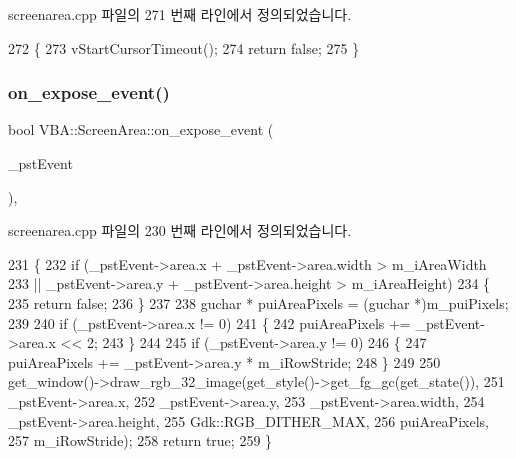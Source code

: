 screenarea.\+cpp 파일의 271 번째 라인에서 정의되었습니다.


\begin{DoxyCode}
272 \{
273   vStartCursorTimeout();
274   \textcolor{keywordflow}{return} \textcolor{keyword}{false};
275 \}
\end{DoxyCode}
\mbox{\label{class_v_b_a_1_1_screen_area_ab800ac1ff230ac9cf33ac144e614160e}} 
\subsubsection{\texorpdfstring{on\+\_\+expose\+\_\+event()}{on\_expose\_event()}}
{\footnotesize\ttfamily bool V\+B\+A\+::\+Screen\+Area\+::on\+\_\+expose\+\_\+event (\begin{DoxyParamCaption}\item[{Gdk\+Event\+Expose $\ast$}]{\+\_\+pst\+Event }\end{DoxyParamCaption})\hspace{0.3cm}{\ttfamily [protected]}, {\ttfamily [virtual]}}



screenarea.\+cpp 파일의 230 번째 라인에서 정의되었습니다.


\begin{DoxyCode}
231 \{
232   \textcolor{keywordflow}{if} (\_pstEvent->area.x + \_pstEvent->area.width > m\_iAreaWidth
233       || \_pstEvent->area.y + \_pstEvent->area.height > m\_iAreaHeight)
234   \{
235     \textcolor{keywordflow}{return} \textcolor{keyword}{false};
236   \}
237 
238   guchar * puiAreaPixels = (guchar *)m\_puiPixels;
239 
240   \textcolor{keywordflow}{if} (\_pstEvent->area.x != 0)
241   \{
242     puiAreaPixels += \_pstEvent->area.x << 2;
243   \}
244 
245   \textcolor{keywordflow}{if} (\_pstEvent->area.y != 0)
246   \{
247     puiAreaPixels += \_pstEvent->area.y * m\_iRowStride;
248   \}
249 
250   get\_window()->draw\_rgb\_32\_image(get\_style()->get\_fg\_gc(get\_state()),
251                                   \_pstEvent->area.x,
252                                   \_pstEvent->area.y,
253                                   \_pstEvent->area.width,
254                                   \_pstEvent->area.height,
255                                   Gdk::RGB\_DITHER\_MAX,
256                                   puiAreaPixels,
257                                   m\_iRowStride);
258   \textcolor{keywordflow}{return} \textcolor{keyword}{true};
259 \}
\end{DoxyCode}
\mbox{\label{class_v_b_a_1_1_screen_area_a15325a7cba813d00e8b2638a6abf651f}} 
